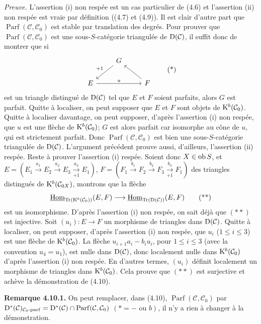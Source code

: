 \documentclass[11pt]{article}
\newcommand{\Parf}{\operatorname{Parf}}
\begin{document}
\emph{Preuve.} L'assertion (i) non respée est un cas particulier de (4.6) et l'assertion (ii) non respée est vraie par définition ((4.7) et (4.9)). Il est clair d'autre part que \(\Parf(\mathcal C,\mathcal C_0)\) est stable par translation des degrés. Pour prouver que \(\Parf(\mathcal C,\mathcal C_0)\) est une sous-\(S\)-catégorie triangulée de \(\mathrm D(\mathcal C)\), il suffit donc de montrer que si
\[
\begin{tikzcd}
& G \arrow[dl,"+1"'] & \\
E \arrow[rr,"u"] && F \arrow[ul]
\end{tikzcd}
\tag{*}
\]
est un triangle distingué de \(\mathrm D(\mathcal C)\) tel que \(E\) et \(F\) soient parfaits, alors \(G\) 
est
parfait. Quitte à localiser, on peut supposer que \(E\) et \(F\) sont objets de \(\mathrm K^b(\mathcal C_0)\). Quitte à localiser davantage, on peut supposer, d'après l'assertion (i) non respée, que \(u\) est une flèche de \(\mathrm K^b(\mathcal C_0)\); \(G\) est alors parfait car isomorphe au cône de \(u\), qui est strictement parfait. Donc \(\Parf(\mathcal C,\mathcal C_0)\) est bien une sous-\(S\)-catégorie triangulée de \(\mathrm D(\mathcal C)\). L'argument précédent prouve aussi, d'ailleurs, l'assertion (ii) respée. Reste à prouver l'assertion (i) respée. Soient donc \(X\in\operatorname{ob} S\), et \(E=(E_1\xrightarrow{a_1}E_2\xrightarrow{a_2}E_3\xrightarrow[+1]{a_3}E_1)\), \(F=(F_1\xrightarrow{b_1}F_2\xrightarrow{b_2}F_3\xrightarrow[+1]{b_3}F_1)\) des triangles distingués de \(\mathrm K^b(\mathcal C_{0X})\), montrons que la flèche
\[
  \underline{\operatorname{Hom}}_{\operatorname{Tr}(\mathrm K^b(\mathcal C_0))}(E,F)
  \longrightarrow
  \underline{\operatorname{Hom}}_{\operatorname{Tr}(\mathrm D(\mathcal C))}(E,F)
  \tag{**}
\]
est un isomorphisme. D'après l'assertion (i) non respée, on sait déjà que \((**)\) est injective. Soit \((u_i):E\to F\) un morphisme de triangles dans \(\mathrm D(\mathcal C)\). Quitte à localiser, on peut supposer, d'après l'assertion (i) non respée, que \(u_i\) (\(1\leq i\leq3\)) est une flèche de \(\mathrm K^b(\mathcal C_0)\). La flèche \(u_{i+1}a_i-b_iu_i\), pour \(1\leq i\leq3\) (avec la convention \(u_4=u_1\)), est nulle dans \(\mathrm D(\mathcal C)\), donc localement nulle dans \(\mathrm K^b(\mathcal C_0)\) d'après l'assertion (i) non respée. En d'autres termes, \((u_i)\) définit localement un morphisme de triangles dans \(\mathrm K^b(\mathcal C_0)\). Cela prouve que \((**)\) est surjective et achève la démonstration de (4.10).

\textbf{Remarque 4.10.1.} On peut remplacer, dans (4.10), \(\Parf(\mathcal C,\mathcal C_0)\) par \(\Dpx^*(\mathcal C)_{\mathcal C_0\text{-}\mathrm{parf}}=\Dpx^*(\mathcal C)\cap\Parf(\mathcal C,\mathcal C_0)\) \((*=-\text{ ou }b)\), il n'y a rien à changer à la démonstration.
\end{document}
